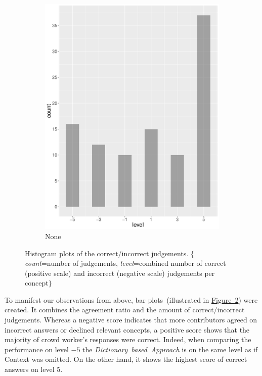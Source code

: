 \begin{figure}
\begin{subfigure}[b]{0.4\textwidth}
        \includegraphics[width=\textwidth]{plots/climate_change/hist_level_none}
        \caption{None}
        \label{fig:hist_level_climate_change_none}
    \end{subfigure}
    \caption{Histogram plots of the correct/incorrect judgements. $\{$\emph{count}=number of judgements, \emph{level}=combined number of correct (positive scale) and incorrect (negative scale) judgements per concept$\}$ }
	\label{fig:hist_level_climate_change_all}
\end{figure}

To manifest our observations from above, bar plots~(illustrated in \hyperref[fig:hist_level_climate_change_all]{Figure~\ref*{fig:hist_level_climate_change_all}}) were created. It combines the agreement ratio and the amount of correct/incorrect judgements. Whereas a negative score indicates that more contributors agreed on incorrect answers or declined relevant concepts, a positive score shows that the majority of crowd worker's responses were correct. Indeed, when comparing the performance on level $-5$ the \emph{Dictionary~based~Approach} is on the same level as if Context was omitted. On the other hand, it shows the highest score of correct answers on level $5$.

